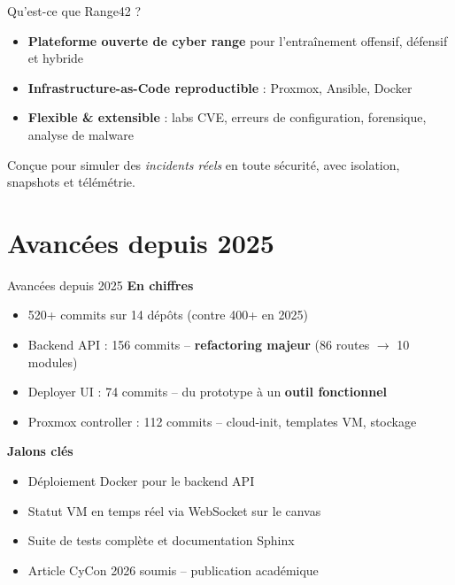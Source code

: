 \documentclass[aspectratio=169]{beamer}
\begin{document}
\begin{frame}{Qu'est-ce que Range42 ?}
  \begin{itemize}
    \item \textbf{Plateforme ouverte de cyber range} pour l'entra\^inement offensif, d\'efensif et hybride
    \item \textbf{Infrastructure-as-Code reproductible} : Proxmox, Ansible, Docker
    \item \textbf{Flexible \& extensible} : labs CVE, erreurs de configuration, forensique, analyse de malware
  \end{itemize}
  \begin{tcolorbox}
    \faInfoCircle\; Con\c{c}ue pour simuler des \emph{incidents r\'eels} en toute s\'ecurit\'e, avec isolation, snapshots et t\'el\'em\'etrie.
  \end{tcolorbox}
\end{frame}

\section{Avanc\'ees depuis 2025}

\begin{frame}{Avanc\'ees depuis 2025 \; \faChartLine}
  \textbf{En chiffres}
  \begin{itemize}
    \item \alert{520+ commits} sur 14 d\'ep\^ots (contre 400+ en 2025)
    \item Backend API : 156 commits -- \textbf{refactoring majeur} (86 routes $\rightarrow$ 10 modules)
    \item Deployer UI : 74 commits -- du prototype \`a un \textbf{outil fonctionnel}
    \item Proxmox controller : 112 commits -- cloud-init, templates VM, stockage
  \end{itemize}
  \vspace{1mm}
  \textbf{Jalons cl\'es}
  \begin{itemize}
    \item \alert{D\'eploiement Docker} pour le backend API
    \item \alert{Statut VM en temps r\'eel} via WebSocket sur le canvas
    \item \alert{Suite de tests compl\`ete} et documentation Sphinx
    \item \alert{Article CyCon 2026 soumis} -- publication acad\'emique
  \end{itemize}
\end{frame}
\end{document}
